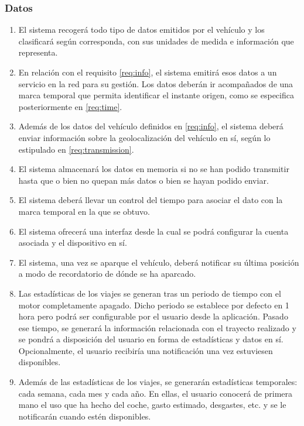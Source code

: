 \subsubsection{Datos}
\begin{enumerate}[resume, label=\textbf{\texttt{RF-\arabic*}}]
  \item\label{req:info} El sistema recogerá todo tipo de datos emitidos por el
        vehículo y los clasificará según corresponda, con sus unidades de medida
        e información que representa.
  \item\label{req:transmission} En relación con el requisito \ref{req:info},
        el sistema emitirá esos datos a un servicio en la red para su gestión. Los
        datos deberán ir acompañados de una marca temporal que permita identificar
        el instante origen, como se especifica posteriormente en \ref{req:time}.
  \item\label{req:gps-data} Además de los datos del vehículo definidos en \ref{req:info},
        el sistema deberá enviar información sobre la geolocalización del vehículo
        en sí, según lo estipulado en \ref{req:transmission}.
  \item\label{req:storage} El sistema almacenará los datos en memoria si no se han podido transmitir
        hasta que o bien no quepan más datos o bien se hayan podido enviar.
  \item\label{req:time} El sistema deberá llevar un control del tiempo para asociar
        el dato con la marca temporal en la que se obtuvo.
  \item\label{req:conf} El sistema ofrecerá una interfaz desde la cual se podrá
        configurar la cuenta asociada y el dispositivo en sí.
  \item\label{req:parking} El sistema, una vez se aparque el vehículo, deberá
        notificar su última posición a modo de recordatorio de dónde se ha aparcado.
  \item\label{req:stats} Las estadísticas de los viajes se generan tras un periodo
        de tiempo con el motor completamente apagado. Dicho periodo se establece por
        defecto en 1 hora pero podrá ser configurable por el usuario desde la aplicación.
        Pasado ese tiempo, se generará la información relacionada con el
        trayecto realizado y se pondrá a disposición del usuario en forma de estadísticas
        y datos en sí. Opcionalmente, el usuario recibiría una notificación una vez
        estuviesen disponibles.
  \item\label{req:periodic-stats} Además de las estadísticas de los viajes,
        se generarán estadísticas temporales: cada semana, cada mes y cada año.
        En ellas, el usuario conocerá de primera mano el uso que ha hecho del coche,
        gasto estimado, desgastes, etc. y se le notificarán cuando estén disponibles.
\end{enumerate}

